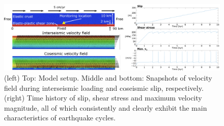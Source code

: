 \documentclass[11pt]{article} %
\begin{document}
\begin{figure}
 \includegraphics[width=\textwidth]{./RSfriction01.png}
 \caption{(left) Top: Model setup. Middle and bottom: Snapshots of velocity field during interseismic loading and coseismic slip, respectively. (right) Time history of slip, shear stress and maximum velocity magnitude, all of which consistently and clearly exhibit the main characteristics of earthquake cycles.}
 \label{fig:RSfriction}
\end{figure}

    
    
    
\end{document}
